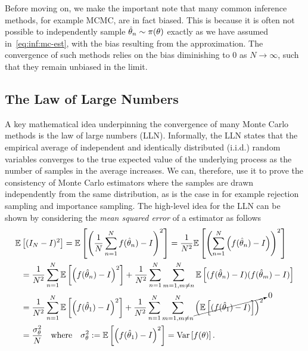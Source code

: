 Before moving
on, we make the important note that many common \mc inference methods, for example MCMC, are in fact biased.  
This is because it is often not possible to independently sample $\hat{\theta}_n \sim \pi(\theta)$
exactly as we have assumed in~\eqref{eq:inf:mc-est}, with the bias resulting from
the approximation.  The convergence of such methods relies on the bias 
diminishing to $0$ as $N\rightarrow\infty$, such that they remain unbiased in the limit.

\subsection{The Law of Large Numbers}
\label{sec:inf:mc:law}

A key mathematical idea underpinning the convergence of many Monte Carlo methods is the 
law of large numbers (LLN).  Informally, the LLN states that the empirical average of 
independent and identically distributed (i.i.d.)  random variables converges to 
the true expected value of the underlying process as the number of samples in the
average increases.  We can, therefore, use it to prove the consistency of Monte Carlo estimators
where the samples are drawn independently from the same distribution, as is the case
in for example rejection sampling and importance sampling.  The high-level idea for the LLN can be shown by
considering the  \emph{mean squared error} of a \mc estimator as 
follows
\begin{align}
\mathbb{E} &\left[(I_N-I)^2\right] = \mathbb{E}\left[\left(\frac{1}{N}\sum_{n=1}^{N}f(\hat{\theta}_n) - I\right)^2\right]
= \frac{1}{N^2}\mathbb{E}\left[\left(\sum_{n=1}^{N} \left(f(\hat{\theta}_n) - I\right)\right)^2\right] \nonumber \\
&= \frac{1}{N^2}\sum_{n=1}^{N} \mathbb{E}\left[ \left(f(\hat{\theta}_n)-I\right)^2\right] + 
\frac{1}{N^2}\sum_{n=1}^{N}\sum_{m=1,m\neq n}^{N} \mathbb{E}\left[ (f(\hat{\theta}_n)-I)(f(\hat{\theta}_m)-I)\right] \nonumber \\
&= \frac{1}{N^2}\sum_{n=1}^{N} \mathbb{E}\left[ \left(f(\hat{\theta}_1)-I\right)^2\right] + 
\frac{1}{N^2}\sum_{n=1}^{N}\sum_{m=1,m\neq n}^{N} \cancelto{0}{\left(\mathbb{E}\left[(f(\hat{\theta}_1)-I)\right]\right)^2} \nonumber \\
&= \frac{\sigma_{\theta}^2}{N}  \quad \text{where} \quad \sigma_{\theta}^2 := \mathbb{E}\left[ \left(f(\hat{\theta}_1)-I\right)^2\right]
= \mathrm{Var} \left[f(\theta)\right].\label{eq:inf:LLN-informal}
\end{align}

